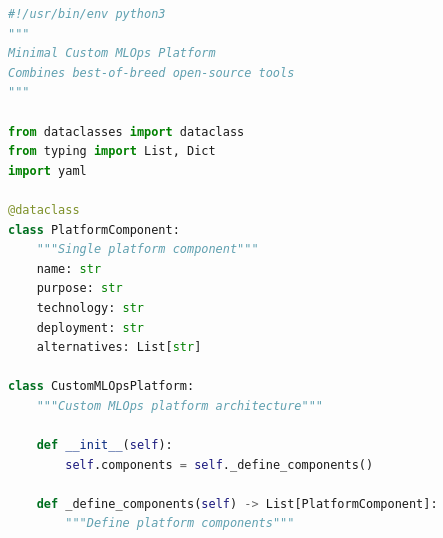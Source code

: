 \begin{lstlisting}[language=Python, caption=Minimal Custom MLOps Platform Design]
#!/usr/bin/env python3
"""
Minimal Custom MLOps Platform
Combines best-of-breed open-source tools
"""

from dataclasses import dataclass
from typing import List, Dict
import yaml

@dataclass
class PlatformComponent:
    """Single platform component"""
    name: str
    purpose: str
    technology: str
    deployment: str
    alternatives: List[str]

class CustomMLOpsPlatform:
    """Custom MLOps platform architecture"""

    def __init__(self):
        self.components = self._define_components()

    def _define_components(self) -> List[PlatformComponent]:
        """Define platform components"""


\end{lstlisting}
